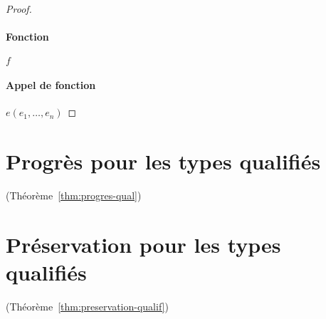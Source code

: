 \begin{proof}
\paragraph{ Fonction }              $ f $ %

\paragraph{ Appel de fonction }     $ e (e_1, …, e_n) $ %


\end{proof}



\section{Progrès pour les types qualifiés}
\label{proof:progres-qualif}

(Théorème~\ref{thm:progres-qual})

\section{Préservation pour les types qualifiés}
\label{proof:preservation-qualif}

(Théorème~\ref{thm:preservation-qualif})

